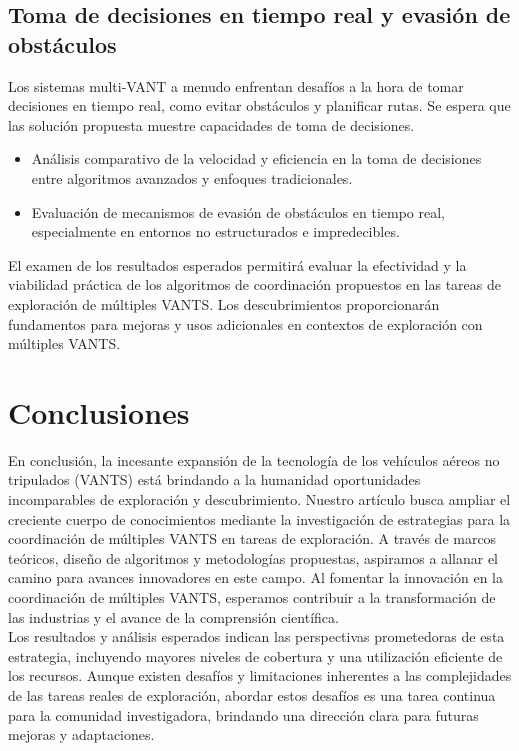\documentclass[sigconf]{acmart}
\begin{document}
\subsection*{Toma de decisiones en tiempo real y evasión de obstáculos}

Los sistemas multi-VANT a menudo enfrentan desafíos a la hora de tomar decisiones en tiempo real, como evitar obstáculos y planificar rutas. Se espera que las solución propuesta muestre capacidades de toma de decisiones.

\begin{itemize}
\item Análisis comparativo de la velocidad y eficiencia en la toma de decisiones entre algoritmos avanzados y enfoques tradicionales.
\item Evaluación de mecanismos de evasión de obstáculos en tiempo real, especialmente en entornos no estructurados e impredecibles.
\end{itemize}

El examen de los resultados esperados permitirá evaluar la efectividad y la viabilidad práctica de los algoritmos de coordinación propuestos en las tareas de exploración de múltiples VANTS. Los descubrimientos proporcionarán fundamentos para mejoras y usos adicionales en contextos de exploración con múltiples VANTS.

\section{Conclusiones}

En conclusión, la incesante expansión de la tecnología de los vehículos aéreos no tripulados (VANTS) está brindando a la humanidad oportunidades incomparables de exploración y descubrimiento. Nuestro artículo busca ampliar el creciente cuerpo de conocimientos mediante la investigación de estrategias para la coordinación de múltiples VANTS en tareas de exploración. A través de marcos teóricos, diseño de algoritmos y metodologías propuestas, aspiramos a allanar el camino para avances innovadores en este campo. Al fomentar la innovación en la coordinación de múltiples VANTS, esperamos contribuir a la transformación de las industrias y el avance de la comprensión científica.\\

Los resultados y análisis esperados indican las perspectivas prometedoras de esta estrategia, incluyendo mayores niveles de cobertura y una utilización eficiente de los recursos. Aunque existen desafíos y limitaciones inherentes a las complejidades de las tareas reales de exploración, abordar estos desafíos es una tarea continua para la comunidad investigadora, brindando una dirección clara para futuras mejoras y adaptaciones.\\
\end{document}
